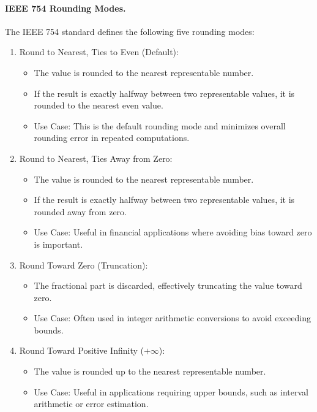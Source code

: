 \paragraph{IEEE 754 Rounding Modes.}
The IEEE 754 standard defines the following five rounding modes:

\begin{enumerate}
    \item Round to Nearest, Ties to Even (Default):
    \begin{itemize}
        \item The value is rounded to the nearest representable number.
        \item If the result is exactly halfway between two representable values, it is rounded to the nearest even value.
        \item Use Case: This is the default rounding mode and minimizes overall rounding error in repeated computations.
    \end{itemize}
    
    \item Round to Nearest, Ties Away from Zero:
    \begin{itemize}
        \item The value is rounded to the nearest representable number.
        \item If the result is exactly halfway between two representable values, it is rounded away from zero.
        \item Use Case: Useful in financial applications where avoiding bias toward zero is important.
    \end{itemize}
    
    \item Round Toward Zero (Truncation):
    \begin{itemize}
        \item The fractional part is discarded, effectively truncating the value toward zero.
        \item Use Case: Often used in integer arithmetic conversions to avoid exceeding bounds.
    \end{itemize}
    
    \item Round Toward Positive Infinity (\(+\infty\)):
    \begin{itemize}
        \item The value is rounded up to the nearest representable number.
        \item Use Case: Useful in applications requiring upper bounds, such as interval arithmetic or error estimation.
    \end{itemize}
    

\end{enumerate}
